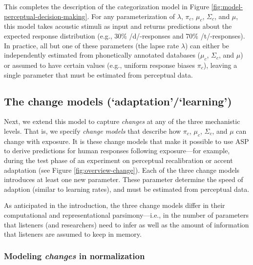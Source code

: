 \documentclass[
  11pt,
  man,floatsintext]{apa6}
\begin{document}
This completes the description of the categorization model in Figure \ref{fig:model-perceptual-decision-making}. For any parameterization of \(\lambda\), \(\pi_c\), \(\mu_c\), \(\Sigma_c\), and \(\mu\), this model takes acoustic stimuli as input and returns predictions about the expected response distribution (e.g., 30\% /d/-responses and 70\% /t/-responses). In practice, all but one of these parameters (the lapse rate \(\lambda\)) can either be independently estimated from phonetically annotated databases (\(\mu_c\), \(\Sigma_c\), and \(\mu\)) or assumed to have certain values (e.g., uniform response biases \(\pi_c\)), leaving a single parameter that must be estimated from perceptual data.

\hypertarget{sec:change-models}{%
\subsection{The change models (`adaptation'/`learning')}\label{sec:change-models}}

Next, we extend this model to capture \emph{changes} at any of the three mechanistic levels. That is, we specify \emph{change models} that describe how \(\pi_c\), \(\mu_c\), \(\Sigma_c\), and \(\mu\) can change with exposure. It is these change models that make it possible to use ASP to derive predictions for human responses following exposure---for example, during the test phase of an experiment on perceptual recalibration or accent adaptation (see Figure \ref{fig:overview-change}). Each of the three change models introduces at least one new parameter. These parameter determine the speed of adaption (similar to learning rates), and must be estimated from perceptual data.

As anticipated in the introduction, the three change models differ in their computational and representational parsimony---i.e., in the number of parameters that listeners (and researchers) need to infer as well as the amount of information that listeners are assumed to keep in memory.

\hypertarget{sec:change-normalization}{%
\subsubsection{\texorpdfstring{Modeling \emph{changes} in normalization}{Modeling changes in normalization}}\label{sec:change-normalization}}
\end{document}
